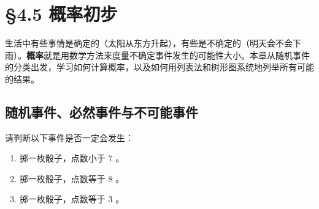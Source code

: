 \chapter{§4.5 概率初步}
\label{sec:4.5}





生活中有些事情是确定的（太阳从东方升起），有些是不确定的（明天会不会下雨）。\textbf{概率}就是用数学方法来度量不确定事件发生的可能性大小。本章从随机事件的分类出发，学习如何计算概率，以及如何用列表法和树形图系统地列举所有可能的结果。



\section*{随机事件、必然事件与不可能事件}


\begin{explore}


请判断以下事件是否一定会发生：

\begin{enumerate}
  \item 掷一枚骰子，点数小于 $7$ 。
  \item 掷一枚骰子，点数等于 $8$ 。
  \item 掷一枚骰子，点数等于 $3$ 。
\end{enumerate}


\end{explore}

